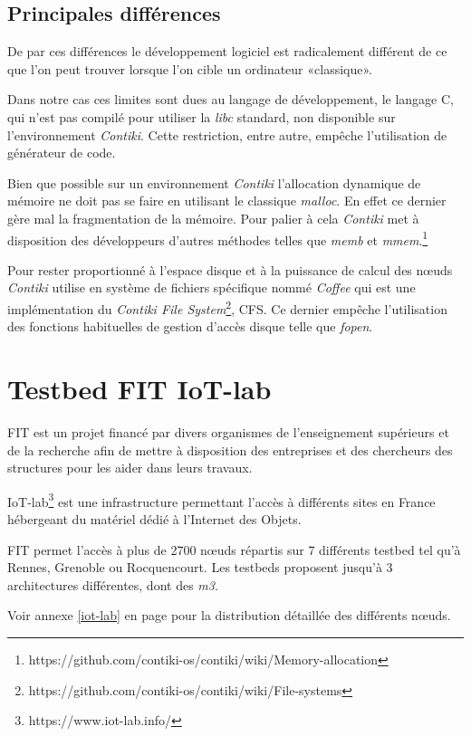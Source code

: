 \subsection{Principales différences}

De par ces différences le développement logiciel est radicalement différent de ce que l'on peut trouver lorsque l'on cible un ordinateur «classique».

Dans notre cas ces limites sont dues au langage de développement, le langage C, qui n'est pas compilé pour utiliser la \emph{libc} standard, non disponible sur l'environnement \emph{Contiki}. Cette restriction, entre autre, empêche l'utilisation de générateur de code.

Bien que possible sur un environnement \emph{Contiki} l'allocation dynamique de mémoire ne doit pas se faire en utilisant le classique \emph{malloc}. En effet ce dernier gère mal la fragmentation de la mémoire. Pour palier à cela \emph{Contiki} met à disposition des développeurs d'autres méthodes telles que \emph{memb} et \emph{mmem}.\footnote{https://github.com/contiki-os/contiki/wiki/Memory-allocation}

Pour rester proportionné à l'espace disque et à la puissance de calcul des nœuds \emph{Contiki} utilise en système de fichiers spécifique nommé \emph{Coffee} qui est une  implémentation du \emph{Contiki File System}\footnote{https://github.com/contiki-os/contiki/wiki/File-systems}, CFS. Ce dernier empêche l'utilisation des fonctions habituelles de gestion d'accès disque telle que \emph{fopen}.

\section{Testbed FIT IoT-lab}

FIT est un projet financé par divers organismes de l'enseignement supérieurs et de la recherche afin de mettre à disposition des entreprises et des chercheurs des structures pour les aider dans leurs travaux.

IoT-lab\footnote{https://www.iot-lab.info/} est une infrastructure permettant l'accès à différents sites en France hébergeant du matériel dédié à l'Internet des Objets.

FIT permet l'accès à plus de 2700 nœuds répartis sur 7 différents testbed tel qu'à Rennes, Grenoble ou Rocquencourt. Les testbeds proposent jusqu'à 3 architectures différentes, dont des \emph{m3}.

Voir annexe \ref{iot-lab} en page \pageref{iot-lab} pour la distribution détaillée des différents nœuds.

